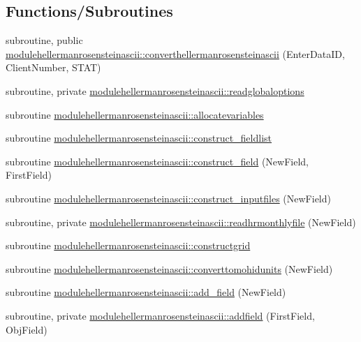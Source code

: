\subsection*{Functions/\+Subroutines}
\begin{DoxyCompactItemize}
\item 
subroutine, public \mbox{\hyperlink{namespacemodulehellermanrosensteinascii_ae9a4ebb5ba70b59aa745588ca89b7a95}{modulehellermanrosensteinascii\+::converthellermanrosensteinascii}} (Enter\+Data\+ID, Client\+Number, S\+T\+AT)
\item 
subroutine, private \mbox{\hyperlink{namespacemodulehellermanrosensteinascii_af439206d121534b62861ec79a514b301}{modulehellermanrosensteinascii\+::readglobaloptions}}
\item 
subroutine \mbox{\hyperlink{namespacemodulehellermanrosensteinascii_ada851e8286a0ae4a7c890a405aefca9e}{modulehellermanrosensteinascii\+::allocatevariables}}
\item 
subroutine \mbox{\hyperlink{namespacemodulehellermanrosensteinascii_aabd09e7a0437013b82c90ca944358684}{modulehellermanrosensteinascii\+::construct\+\_\+fieldlist}}
\item 
subroutine \mbox{\hyperlink{namespacemodulehellermanrosensteinascii_af3153ec18443db4efe86a28f2c87ad90}{modulehellermanrosensteinascii\+::construct\+\_\+field}} (New\+Field, First\+Field)
\item 
subroutine \mbox{\hyperlink{namespacemodulehellermanrosensteinascii_a6ad7240d2c79e9b8cf9e5e96021b2650}{modulehellermanrosensteinascii\+::construct\+\_\+inputfiles}} (New\+Field)
\item 
subroutine, private \mbox{\hyperlink{namespacemodulehellermanrosensteinascii_a8a33a7b75c9d86b3447e0ab4f459e1c9}{modulehellermanrosensteinascii\+::readhrmonthlyfile}} (New\+Field)
\item 
subroutine \mbox{\hyperlink{namespacemodulehellermanrosensteinascii_aa865ee380c14fc3435be60b54b2d2513}{modulehellermanrosensteinascii\+::constructgrid}}
\item 
subroutine \mbox{\hyperlink{namespacemodulehellermanrosensteinascii_a8d26b87c5c59b45954adf68b0ada3545}{modulehellermanrosensteinascii\+::converttomohidunits}} (New\+Field)
\item 
subroutine \mbox{\hyperlink{namespacemodulehellermanrosensteinascii_a39c581f7647526ad3d09ea87b66e024a}{modulehellermanrosensteinascii\+::add\+\_\+field}} (New\+Field)
\item 
subroutine, private \mbox{\hyperlink{namespacemodulehellermanrosensteinascii_a0456421b402f98f76f0ff495f712916f}{modulehellermanrosensteinascii\+::addfield}} (First\+Field, Obj\+Field)

\end{DoxyCompactItemize}
